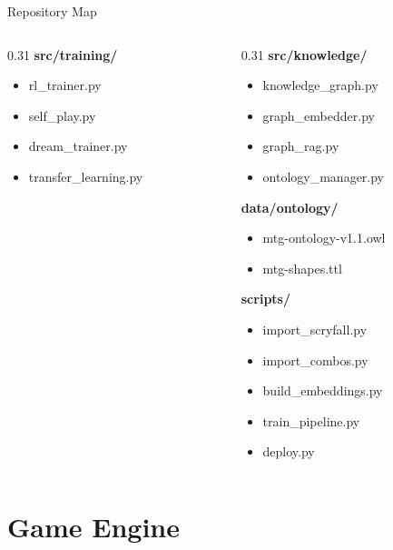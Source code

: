 \documentclass[aspectratio=169, 10pt]{beamer}
\begin{document}
\begin{frame}{Repository Map}
\begin{columns}[T]
\begin{column}{0.31\textwidth}
      \vspace{0.15cm}
      \textbf{src/training/}\\
      \begin{itemize}\scriptsize
        \item rl\_trainer.py
        \item self\_play.py
        \item dream\_trainer.py
        \item transfer\_learning.py
      \end{itemize}
    \end{column}
    \begin{column}{0.31\textwidth}
      \footnotesize
      \textbf{src/knowledge/}\\
      \begin{itemize}\scriptsize
        \item knowledge\_graph.py
        \item graph\_embedder.py
        \item graph\_rag.py
        \item ontology\_manager.py
      \end{itemize}
      \vspace{0.15cm}
      \textbf{data/ontology/}\\
      \begin{itemize}\scriptsize
        \item mtg-ontology-v1.1.owl
        \item mtg-shapes.ttl
      \end{itemize}
      \vspace{0.15cm}
      \textbf{scripts/}\\
      \begin{itemize}\scriptsize
        \item import\_scryfall.py
        \item import\_combos.py
        \item build\_embeddings.py
        \item train\_pipeline.py
        \item deploy.py
      \end{itemize}
    \end{column}
  \end{columns}
\end{frame}


\section{Game Engine}
\end{document}
